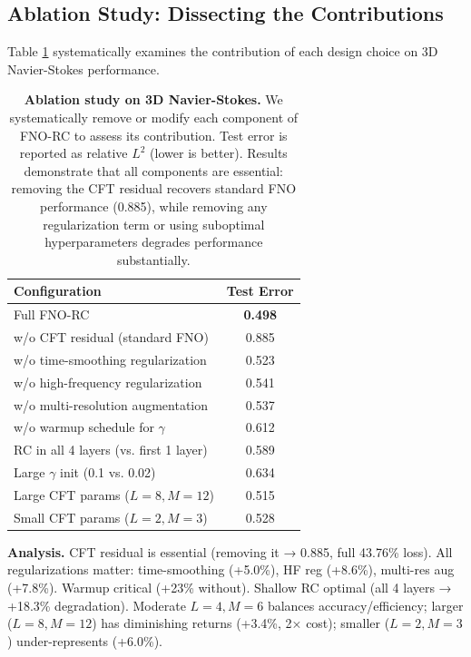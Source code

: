 \documentclass[11pt]{article}
\begin{document}
\subsection{Ablation Study: Dissecting the Contributions}

Table \ref{tab:ablation} systematically examines the contribution of each design choice on 3D Navier-Stokes performance.

\begin{table}[h]
\centering
\caption{\textbf{Ablation study on 3D Navier-Stokes.} We systematically remove or modify each component of FNO-RC to assess its contribution. Test error is reported as relative $L^2$ (lower is better). Results demonstrate that all components are essential: removing the CFT residual recovers standard FNO performance (0.885), while removing any regularization term or using suboptimal hyperparameters degrades performance substantially.}
\label{tab:ablation}
\small
\begin{tabular}{@{}lc@{}}
\toprule
\textbf{Configuration} & \textbf{Test Error} \\
\midrule
Full FNO-RC & \textbf{0.498} \\
\midrule
w/o CFT residual (standard FNO) & 0.885 \\
w/o time-smoothing regularization & 0.523 \\
w/o high-frequency regularization & 0.541 \\
w/o multi-resolution augmentation & 0.537 \\
w/o warmup schedule for $\gamma$ & 0.612 \\
\midrule
RC in all 4 layers (vs. first 1 layer) & 0.589 \\
Large $\gamma$ init (0.1 vs. 0.02) & 0.634 \\
Large CFT params ($L=8, M=12$) & 0.515 \\
Small CFT params ($L=2, M=3$) & 0.528 \\
\bottomrule
\end{tabular}
\end{table}

\textbf{Analysis.} CFT residual is essential (removing it → 0.885, full 43.76\% loss). All regularizations matter: time-smoothing (+5.0\%), HF reg (+8.6\%), multi-res aug (+7.8\%). Warmup critical (+23\% without). Shallow RC optimal (all 4 layers → +18.3\% degradation). Moderate $L=4, M=6$ balances accuracy/efficiency; larger ($L=8, M=12$) has diminishing returns (+3.4\%, 2× cost); smaller ($L=2, M=3$) under-represents (+6.0\%).
\end{document}
